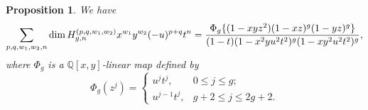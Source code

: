 \documentclass[11pt,reqno]{amsproc}
\numberwithin{equation}{section}
\newtheorem{proposition}[theorem]{Proposition}
\theoremstyle{definition}
\theoremstyle{remark}
\newcommand\Q{{\mathbb Q}}
\DeclarePairedDelimiter{\set}{\{}{\}}
\begin{document}
\begin{proposition}
    We have
    \begin{equation}\label{eq:hilbert-hgn}
        \sum_{p,q,w_1,w_2,n} \dim H_{g,n}^{(p,q,w_1,w_2)} x^{w_1}y^{w_2}(-u)^{p+q}t^n =\frac{\Phi_g\set{(1-xyz^2)(1-xz)^g(1-yz)^g}}{(1-t)(1-x^2 yu^2t^2)^g(1-xy^2u^2t^2)^g},
    \end{equation}
    where $\Phi_g$ is a $\Q[x,y]$-linear map defined by 
    \begin{equation}\label{eq:shiftDef}
    \Phi_g(z^j)=\begin{cases}
    u^j t^j,& 0\leq j\leq g;\\
    u^{j-1}t^j,& g+2\leq j\leq 2g+2.
    \end{cases}
    \end{equation}
\end{proposition}
\end{document}
